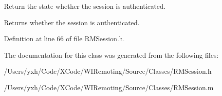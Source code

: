 Return the state whether the session is authenticated. \begin{DoxyReturn}{Returns}
whether the session is authenticated. 
\end{DoxyReturn}


Definition at line 66 of file RMSession.h.

The documentation for this class was generated from the following files:\begin{DoxyCompactItemize}
\item 
/Users/yxh/Code/XCode/WIRemoting/Source/Classes/RMSession.h\item 
/Users/yxh/Code/XCode/WIRemoting/Source/Classes/RMSession.m\end{DoxyCompactItemize}
